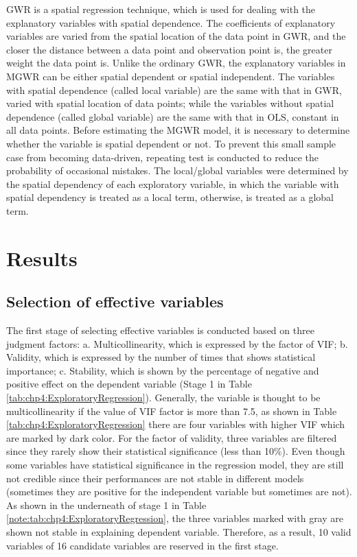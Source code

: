 %
GWR is a spatial regression technique, which is used for dealing with the explanatory variables with spatial dependence. The coefficients of explanatory variables are varied from the spatial location of the data point in GWR, and the closer the distance between a data point and observation point is, the greater weight the data point is. Unlike the ordinary GWR, the explanatory variables in MGWR can be either spatial dependent or spatial independent. The variables with spatial dependence (called local variable) are the same with that in GWR, varied with spatial location of data points; while the variables without spatial dependence (called global variable) are the same with that in OLS, constant in all data points. Before estimating the MGWR model, it is necessary to determine whether the variable is spatial dependent or not. To prevent this small sample case from becoming data-driven, repeating test is conducted to reduce the probability of occasional mistakes. The local/global variables were determined by the spatial dependency of each exploratory variable, in which the variable with spatial dependency is treated as a local term, otherwise, is treated as a global term.

%
\section{Results}
\subsection{Selection of effective variables}
%
The first stage of selecting effective variables is conducted based on three judgment factors: a. Multicollinearity, which is expressed by the factor of VIF; b. Validity, which is expressed by the number of times that shows statistical importance; c. Stability, which is shown by the percentage of negative and positive effect on the dependent variable (Stage 1 in Table \ref{tab:chp4:ExploratoryRegression}). Generally, the variable is thought to be multicollinearity if the value of VIF factor is more than 7.5, as shown in Table \ref{tab:chp4:ExploratoryRegression} there are four variables with higher VIF which are marked by dark color. For the factor of validity, three variables are filtered since they rarely show their statistical significance (less than 10\%). Even though some variables have statistical significance in the regression model, they are still not credible since their performances are not stable in different models (sometimes they are positive for the independent variable but sometimes are not). As shown in the underneath of stage 1 in Table \ref{note:tab:chp4:ExploratoryRegression}, the three variables marked with gray are shown not stable in explaining dependent variable. Therefore, as a result, 10 valid variables of 16 candidate variables are reserved in the first stage.

